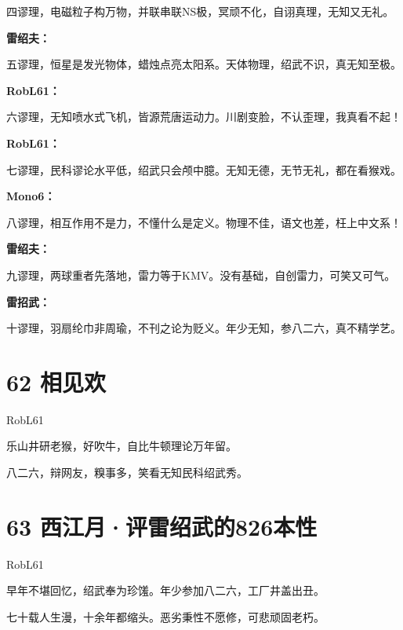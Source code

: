 \documentclass[UTF8,12pt,oneside]{ctexbook}
\begin{document}
        四谬理，电磁粒子构万物，并联串联NS极，冥顽不化，自诩真理，无知又无礼。
        
        \noindent\textbf{雷绍夫：}
        
        五谬理，恒星是发光物体，蜡烛点亮太阳系。天体物理，绍武不识，真无知至极。
        
        \noindent\textbf{RobL61：}
        
        六谬理，无知喷水式飞机，皆源荒唐运动力。川剧变脸，不认歪理，我真看不起！
        
        \noindent\textbf{RobL61：}
        
        七谬理，民科谬论水平低，绍武只会颅中臆。无知无德，无节无礼，都在看猴戏。
        
        \noindent\textbf{Mono6：}
        
        八谬理，相互作用不是力，不懂什么是定义。物理不佳，语文也差，枉上中文系！
        
        \noindent\textbf{雷绍夫：}
        
        九谬理，两球重者先落地，雷力等于KMV。没有基础，自创雷力，可笑又可气。
        
        \noindent\textbf{雷招武：}
        
        十谬理，羽扇纶巾非周瑜，不刊之论为贬义。年少无知，参八二六，真不精学艺。
        
        
        \section{62 相见欢}
        \begin{center}
            RobL61
        \end{center}
        
        乐山井研老猴，好吹牛，自比牛顿理论万年留。
        
        八二六，辩网友，糗事多，笑看无知民科绍武秀。
        
        \section{63 西江月·评雷绍武的826本性}
        \begin{center}
            RobL61
        \end{center}
        
        早年不堪回忆，绍武奉为珍馐。年少参加八二六，工厂井盖出丑。
        
        七十载人生漫，十余年都缩头。恶劣秉性不愿修，可悲顽固老朽。
        
\end{document}
